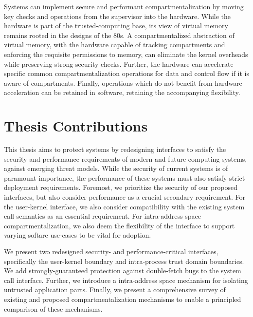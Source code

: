 Systems can implement secure and performant compartmentalization by moving
key checks and operations from the supervisor into the hardware.
While the hardware is part of the trusted-computing base, its view of virtual
memory remains rooted in the designs of the 80s.
A compartmentalized abstraction of virtual memory, with the hardware capable
of tracking compartments and enforcing the requisite permissions to memory,
can eliminate the kernel overheads while preserving strong security checks.
Further, the hardware can accelerate specific common compartmentalization
operations for data and control flow if it is aware of compartments.
Finally, operations which do not benefit from hardware acceleration can
be retained in software, retaining the accompanying flexibility.

\section{Thesis Contributions}

This thesis aims to protect systems by redesigning interfaces to satisfy 
the security and performance requirements of modern and future computing 
systems, against emerging threat models.
While the security of current systems is of paramount importance, the
performance of these systems must also satisfy strict deployment 
requirements.
Foremost, we prioritize the security of our proposed interfaces, but also
consider performance as a crucial secondary requirement.
For the user-kernel interface, we also consider compatibility with
the existing system call semantics as an essential requirement.
For intra-address space compartmentalization, we also deem the flexibility
of the interface to support varying softare use-cases to be vital for adoption.

We present two redesigned security- and performance-critical 
interfaces, specifically the user-kernel boundary and 
intra-process trust domain boundaries.
We add strongly-guaranteed protection against double-fetch bugs to
the system call interface.
Further, we introduce a intra-address space mechanism for
isolating untrusted application parts.
Finally, we present a comprehensive survey of existing and proposed
compartmentalization mechanisms to enable a principled comparison
of these mechanisms.

